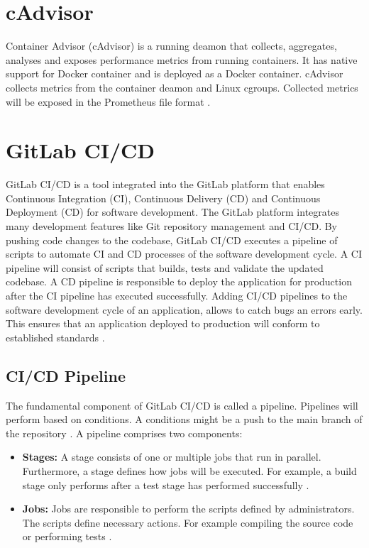 \section{cAdvisor}
Container Advisor (cAdvisor) is a running deamon that collects, aggregates, analyses and exposes performance metrics from running containers.
It has native support for Docker container and is deployed as a Docker container.
cAdvisor collects metrics from the container deamon and Linux cgroups.
Collected metrics will be exposed in the Prometheus file format \cite{Bastos2019Prom, cadvisor2020Docs}.


\section{GitLab CI/CD}
GitLab CI/CD is a tool integrated into the GitLab platform that enables Continuous Integration (CI), Continuous Delivery (CD) and Continuous Deployment (CD) for software development.
The GitLab platform integrates many development features like Git repository management and CI/CD.
By pushing code changes to the codebase, GitLab CI/CD executes a pipeline of scripts to automate CI and CD processes of the software development cycle.
A CI pipeline will consist of scripts that builds, tests and validate the updated codebase.
A CD pipeline is responsible to deploy the application for production after the CI pipeline has executed successfully.
Adding CI/CD pipelines to the software development cycle of an application, allows to catch bugs an errors early. This ensures that an application deployed to production will conform to established standards \cite{Gitlab2020Docs}.

\subsection{CI/CD Pipeline}

The fundamental component of GitLab CI/CD is called a pipeline. Pipelines will perform based on conditions. A conditions might be a push to the main branch of the repository \cite{Gitlab2020Docs}. A pipeline comprises two components:

\begin{itemize}
\item \textbf{Stages:} A stage consists of one or multiple jobs that run in parallel. Furthermore, a stage defines how jobs will be executed. For example, a build stage only performs after a test stage has performed successfully \cite{Gitlab2020Docs}.

\item \textbf{Jobs:} Jobs are responsible to perform the scripts defined by administrators. The scripts define necessary actions. For example compiling the source code or performing tests \cite{Gitlab2020Docs}.
\end{itemize}


